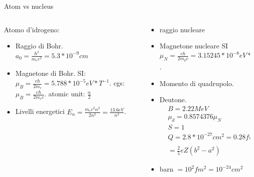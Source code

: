 \begin{frame}{Atom vs nucleus}
\begin{columns}[T]
\begin{column}{0.5\textwidth}
Atomo d'idrogeno:
    \begin{itemize}
        \item Raggio di Bohr.
$a_0=\frac{\hbar^2}{m_ee^2}=5.3*10^{-9} cm$
\item Magnetone di Bohr.
SI: $\mu_B=\frac{e\hbar}{2m_e}=5.788*10^{-5}eV*T^{-1}$.
cgs: $\mu_B=\frac{e\hbar}{2m_ec}$.
atomic unit: $\frac{\alpha}{2}$
\item  Livelli energetici $E_n=\frac{m_ec^2\alpha^2}{2n^2}=\frac{13.6eV}{n^2}$.
    \end{itemize}
\end{column}
\begin{column}{0.5\textwidth}
    \begin{itemize}
        \item    raggio nucleare
        \item Magnetone nucleare
SI $\mu_N=\frac{e\hbar}{2m_pc}=3.15245*10^{-8}eV*T^{-1}=\frac{\mu_B}{1836}$.
\item Momento di quadrupolo.
\item Deutone.
\begin{align*}
&B=2.22 MeV\\
&\mu_d=0.8574376\mu_N\\
&S=1\\
&Q=2.8*10^{-27}cm^2=0.28fm^2(Q_{zz})\\
&=\frac{2}{5}eZ(b^2-a^2)
\end{align*}
\item barn $=10^2 fm^2=10^{-24}cm^2$
    \end{itemize}
\end{column}
\end{columns}
\end{frame}